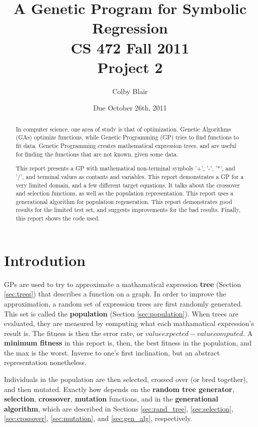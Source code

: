 \documentclass[12pt]{article}
\title{A Genetic Program for Symbolic Regression \\
CS 472 Fall 2011 \\
     Project 2}
\author{Colby Blair}
\date{Due October 26th, 2011}
\begin{document}
\maketitle

\begin{abstract}
In computer science, one area of study is that of optimization. Genetic Algorithms (GAs) optimize functions, while Genetic Programming (GP) tries to find functions to fit data. Genetic Programming creates mathematical expression trees, and are useful for finding the functions that are not known, given some data.

This report presents a GP with mathematical non-terminal symbols '+', '-', '*', and '/', and terminal values as contants and variables. This report demonstrates a GP for a very limited domain, and a few different target equations. It talks about the crossover and selection functions, as well as the population representation. This report uses a generational algorithm for population regeneration. This report demonstrates good results for the limited test set, and suggests improvements for the bad results. Finally, this report shows the code used.
\end{abstract}

\pagebreak

\tableofcontents

\pagebreak

\listoffigures

\pagebreak


\part{Introdution}
GPs are used to try to approximate a mathamatical expression \textbf{tree} (Section \ref{sec:trees}) that describes a function on a graph. In order to improve the approximation, a random set of expression trees are first randomly generated. This set is called the \textbf{population} (Section \ref{sec:population}). When trees are evaluated, they are measured by computing what each mathamatical expression's result is. The fitness is then the error rate, or $ value expected - value computed $. A \textbf{minimum fitness} in this report is, then, the best fitness in the population, and the max is the worst. Inverse to one's first inclination, but an abstract representation nonetheless.

Individuals in the population are then selected, crossed over (or bred together), and then mutated. Exactly how depends on the \textbf{random tree generator}, \textbf{selection}, \textbf{crossover}, \textbf{mutation} functions, and in the \textbf{generational algorithm}, which are described in Sections \ref{sec:rand_tree}, \ref{sec:selection}, \ref{sec:crossover}, \ref{sec:mutation}, and \ref{sec:gen_alg}, respectively.
\end{document}
